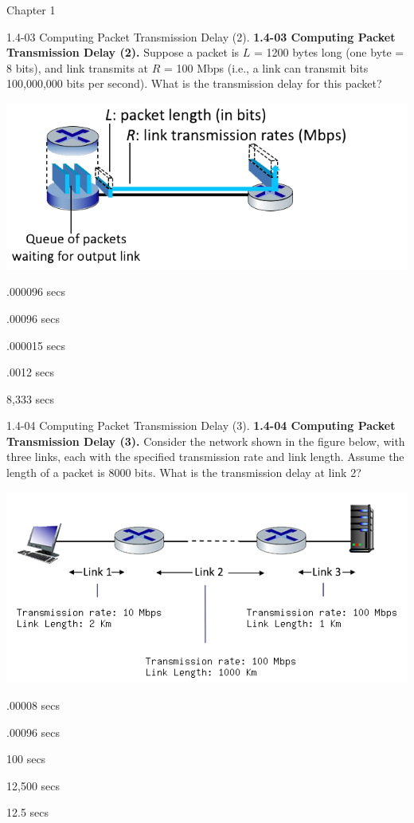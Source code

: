 \documentclass[a4paper]{article}
\begin{document}
\begin{quiz}{Chapter 1}
\begin{multi}[points=1,shuffle=true]{1.4-03 Computing Packet Transmission Delay (2).}
\textbf{1.4-03 Computing Packet Transmission Delay (2).} 
Suppose a packet is $L$ = 1200 bytes long (one byte = 8 bits), and link transmits at $R$ = 100 Mbps (i.e., a link can transmit bits 100,000,000 bits per second).  What is the transmission delay for this packet?
\begin{center}
\includegraphics[width=.8\linewidth]{figs/1.4.2.png}
\end{center}
\item* .000096 secs
\item .00096 secs
\item .000015 secs
\item .0012 secs
\item 8,333 secs
\end{multi}

\begin{multi}[points=1,shuffle=true]{1.4-04 Computing Packet Transmission Delay (3).}
\textbf{1.4-04 Computing Packet Transmission Delay (3).} 
Consider the network shown in the figure below, with three links, each with the specified transmission rate and link length. Assume the length of a packet is 8000 bits. What is the transmission delay at link 2? 
\begin{center}
\includegraphics[width=.9\linewidth]{figs/1.4.4.png}
\end{center}
\item* .00008 secs
\item .00096 secs
\item 100 secs
\item 12,500 secs
\item 12.5 secs
\end{multi}


\end{quiz}
\end{document}

